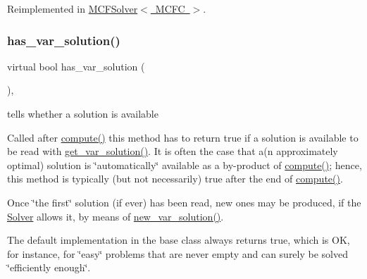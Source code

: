 Reimplemented in \mbox{\hyperlink{class_s_m_spp__di__unipi__it_1_1_m_c_f_solver_a4f0fecd26f7731710ff6af22fa0cc635}{M\+C\+F\+Solver$<$ M\+C\+F\+C $>$}}.

\mbox{\label{class_s_m_spp__di__unipi__it_1_1_solver_aa96263f4e0c59225f3f5d54f03fe31ee}} 
\subsubsection{\texorpdfstring{has\+\_\+var\+\_\+solution()}{has\_var\_solution()}}
{\footnotesize\ttfamily virtual bool has\+\_\+var\+\_\+solution (\begin{DoxyParamCaption}\item[{void}]{ }\end{DoxyParamCaption})\hspace{0.3cm}{\ttfamily [inline]}, {\ttfamily [virtual]}}



tells whether a solution is available 

Called after \mbox{\hyperlink{class_s_m_spp__di__unipi__it_1_1_solver_a504d4e3e174c7a518cc66156a8a45ce5}{compute()}} this method has to return true if a solution is available to be read with \mbox{\hyperlink{class_s_m_spp__di__unipi__it_1_1_solver_a91d7cd0dc4fa453406ef30db2bfa37a5}{get\+\_\+var\+\_\+solution()}}. It is often the case that a(n approximately optimal) solution is \char`\"{}automatically\char`\"{} available as a by-\/product of \mbox{\hyperlink{class_s_m_spp__di__unipi__it_1_1_solver_a504d4e3e174c7a518cc66156a8a45ce5}{compute()}}; hence, this method is typically (but not necessarily) true after the end of \mbox{\hyperlink{class_s_m_spp__di__unipi__it_1_1_solver_a504d4e3e174c7a518cc66156a8a45ce5}{compute()}}.

Once \char`\"{}the first\char`\"{} solution (if ever) has been read, new ones may be produced, if the \mbox{\hyperlink{class_s_m_spp__di__unipi__it_1_1_solver}{Solver}} allows it, by means of \mbox{\hyperlink{class_s_m_spp__di__unipi__it_1_1_solver_af109b504a566c90a4ea45c1574c128fe}{new\+\_\+var\+\_\+solution()}}.

The default implementation in the base class always returns true, which is OK, for instance, for \char`\"{}easy\char`\"{} problems that are never empty and can surely be solved \char`\"{}efficiently enough\char`\"{}. 

